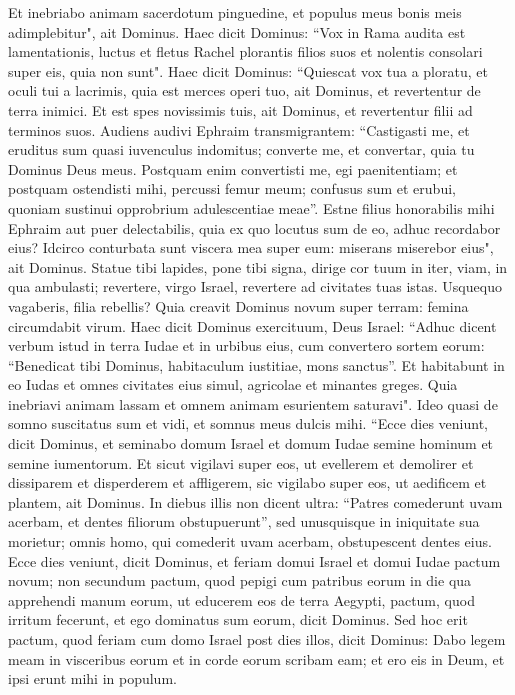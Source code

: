 \begin{biblechapter}
\verse Et inebriabo animam sacerdotum pinguedine, et populus meus bonis meis adimplebitur", ait Dominus. 
\verse Haec dicit Dominus: “Vox in Rama audita est lamentationis, luctus et fletus Rachel plorantis filios suos et nolentis consolari super eis, quia non sunt". 
\verse Haec dicit Dominus: “Quiescat vox tua a ploratu, et oculi tui a lacrimis, quia est merces operi tuo, ait Dominus, et revertentur de terra inimici. 
\verse Et est spes novissimis tuis, ait Dominus, et revertentur filii ad terminos suos. 
\verse Audiens audivi Ephraim transmigrantem: “Castigasti me, et eruditus sum quasi iuvenculus indomitus; converte me, et convertar, quia tu Dominus Deus meus. 
\verse Postquam enim convertisti me, egi paenitentiam; et postquam ostendisti mihi, percussi femur meum; confusus sum et erubui, quoniam sustinui opprobrium adulescentiae meae”. 
\verse Estne filius honorabilis mihi Ephraim aut puer delectabilis, quia ex quo locutus sum de eo, adhuc recordabor eius? Idcirco conturbata sunt viscera mea super eum: miserans miserebor eius", ait Dominus. 
\verse Statue tibi lapides, pone tibi signa, dirige cor tuum in iter, viam, in qua ambulasti; revertere, virgo Israel, revertere ad civitates tuas istas. 
\verse Usquequo vagaberis, filia rebellis? Quia creavit Dominus novum super terram: femina circumdabit virum. 
\verse Haec dicit Dominus exercituum, Deus Israel: “Adhuc dicent verbum istud in terra Iudae et in urbibus eius, cum convertero sortem eorum: “Benedicat tibi Dominus, habitaculum iustitiae, mons sanctus”. 
\verse Et habitabunt in eo Iudas et omnes civitates eius simul, agricolae et minantes greges. 
\verse Quia inebriavi animam lassam et omnem animam esurientem saturavi". 
\verse Ideo quasi de somno suscitatus sum et vidi, et somnus meus dulcis mihi. 
\verse “Ecce dies veniunt, dicit Dominus, et seminabo domum Israel et domum Iudae semine hominum et semine iumentorum. 
\verse Et sicut vigilavi super eos, ut evellerem et demolirer et dissiparem et disperderem et affligerem, sic vigilabo super eos, ut aedificem et plantem, ait Dominus. 
\verse In diebus illis non dicent ultra: “Patres comederunt uvam acerbam, et dentes filiorum obstupuerunt”, 
\verse sed unusquisque in iniquitate sua morietur; omnis homo, qui comederit uvam acerbam, obstupescent dentes eius. 
\verse Ecce dies veniunt, dicit Dominus, et feriam domui Israel et domui Iudae pactum novum; 
\verse non secundum pactum, quod pepigi cum patribus eorum in die qua apprehendi manum eorum, ut educerem eos de terra Aegypti, pactum, quod irritum fecerunt, et ego dominatus sum eorum, dicit Dominus. 
\verse Sed hoc erit pactum, quod feriam cum domo Israel post dies illos, dicit Dominus: Dabo legem meam in visceribus eorum et in corde eorum scribam eam; et ero eis in Deum, et ipsi erunt mihi in populum. 

\end{biblechapter}
